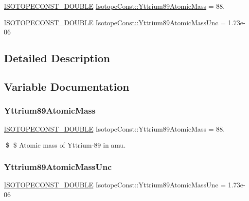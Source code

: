 \begin{DoxyCompactItemize}
\item 
\mbox{\hyperlink{group___isotope_const-_macros_ga8f45a7272ce02c0b4c65c44636ed719a}{I\+S\+O\+T\+O\+P\+E\+C\+O\+N\+S\+T\+\_\+\+D\+O\+U\+B\+LE}} \mbox{\hyperlink{group___isotope_const-_yttrium-_y89_ga51ef03f203e29d39044f1ddf903e25bc}{Isotope\+Const\+::\+Yttrium89\+Atomic\+Mass}} = 88.
\item 
\mbox{\hyperlink{group___isotope_const-_macros_ga8f45a7272ce02c0b4c65c44636ed719a}{I\+S\+O\+T\+O\+P\+E\+C\+O\+N\+S\+T\+\_\+\+D\+O\+U\+B\+LE}} \mbox{\hyperlink{group___isotope_const-_yttrium-_y89_ga8ad01722de2685665cb9bf6de134e836}{Isotope\+Const\+::\+Yttrium89\+Atomic\+Mass\+Unc}} = 1.\+73e-\/06
\end{DoxyCompactItemize}


\subsection{Detailed Description}


\subsection{Variable Documentation}
\mbox{\label{group___isotope_const-_yttrium-_y89_ga51ef03f203e29d39044f1ddf903e25bc}} 
\subsubsection{\texorpdfstring{Yttrium89\+Atomic\+Mass}{Yttrium89AtomicMass}}
{\footnotesize\ttfamily \mbox{\hyperlink{group___isotope_const-_macros_ga8f45a7272ce02c0b4c65c44636ed719a}{I\+S\+O\+T\+O\+P\+E\+C\+O\+N\+S\+T\+\_\+\+D\+O\+U\+B\+LE}} Isotope\+Const\+::\+Yttrium89\+Atomic\+Mass = 88.}

\$ \$ Atomic mass of Yttrium-\/89 in amu. \mbox{\label{group___isotope_const-_yttrium-_y89_ga8ad01722de2685665cb9bf6de134e836}} 
\subsubsection{\texorpdfstring{Yttrium89\+Atomic\+Mass\+Unc}{Yttrium89AtomicMassUnc}}
{\footnotesize\ttfamily \mbox{\hyperlink{group___isotope_const-_macros_ga8f45a7272ce02c0b4c65c44636ed719a}{I\+S\+O\+T\+O\+P\+E\+C\+O\+N\+S\+T\+\_\+\+D\+O\+U\+B\+LE}} Isotope\+Const\+::\+Yttrium89\+Atomic\+Mass\+Unc = 1.\+73e-\/06}

